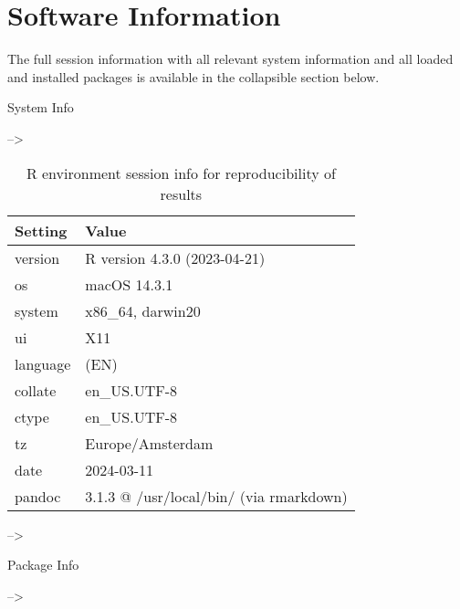 \documentclass[
]{article}
\begin{document}
\hypertarget{software-information}{%
\section{Software Information}\label{software-information}}

The full session information with all relevant system information and
all loaded and installed packages is available in the collapsible
section below.

System Info

--\textgreater{}

\begin{table}

\caption{\label{tab:Reproducibility-sessionInfo-R-environment}R environment session info for reproducibility of results}
\centering
\begin{tabular}[t]{ll}
\toprule
Setting & Value\\
\midrule
version & R version 4.3.0 (2023-04-21)\\
os & macOS 14.3.1\\
system & x86\_64, darwin20\\
ui & X11\\
language & (EN)\\
\addlinespace
collate & en\_US.UTF-8\\
ctype & en\_US.UTF-8\\
tz & Europe/Amsterdam\\
date & 2024-03-11\\
pandoc & 3.1.3 @ /usr/local/bin/ (via rmarkdown)\\
\bottomrule
\end{tabular}
\end{table}

--\textgreater{}

Package Info

--\textgreater{}
\end{document}
